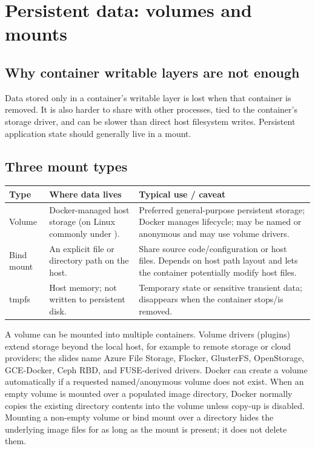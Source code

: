 \documentclass[11pt,a4paper]{article}
\newcommand{\cmd}[1]{\texttt{\detokenize{#1}}}
\begin{document}
\section{Persistent data: volumes and mounts}
\subsection{Why container writable layers are not enough}
Data stored only in a container's writable layer is lost when that container is removed. It is also harder to share with other processes, tied to the container's storage driver, and can be slower than direct host filesystem writes. Persistent application state should generally live in a mount.

\subsection{Three mount types}
\begin{longtable}{p{.18\linewidth}p{.38\linewidth}p{.36\linewidth}}\toprule
\textbf{Type} & \textbf{Where data lives} & \textbf{Typical use / caveat}\\\midrule
\endhead
Volume & Docker-managed host storage (on Linux commonly under \cmd{/var/lib/docker/volumes/}). & Preferred general-purpose persistent storage; Docker manages lifecycle; may be named or anonymous and may use volume drivers.\\
Bind mount & An explicit file or directory path on the host. & Share source code/configuration or host files. Depends on host path layout and lets the container potentially modify host files.\\
tmpfs & Host memory; not written to persistent disk. & Temporary state or sensitive transient data; disappears when the container stops/is removed.\\\bottomrule
\end{longtable}
A volume can be mounted into multiple containers. Volume drivers (plugins) extend storage beyond the local host, for example to remote storage or cloud providers; the slides name Azure File Storage, Flocker, GlusterFS, OpenStorage, GCE-Docker, Ceph RBD, and FUSE-derived drivers. Docker can create a volume automatically if a requested named/anonymous volume does not exist. When an empty volume is mounted over a populated image directory, Docker normally copies the existing directory contents into the volume unless copy-up is disabled. Mounting a non-empty volume or bind mount over a directory hides the underlying image files for as long as the mount is present; it does not delete them.
\end{document}

